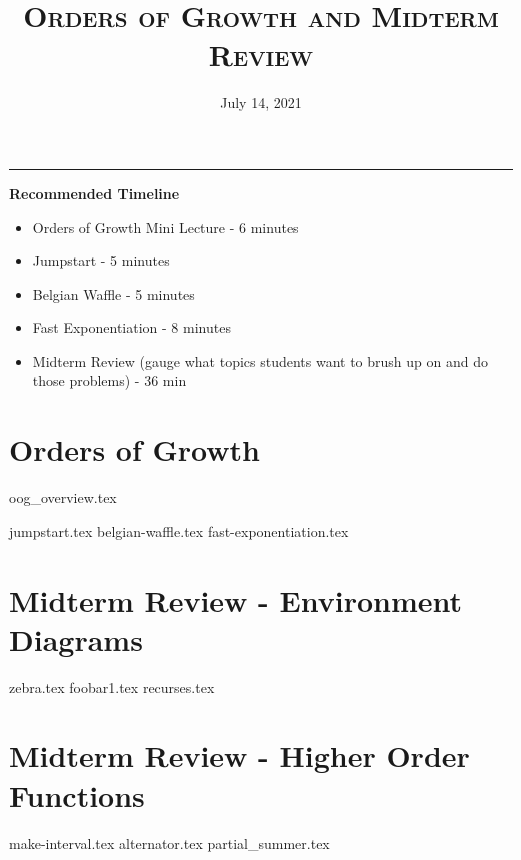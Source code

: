 \documentclass{exam}
\title{\textsc{Orders of Growth and Midterm Review}}
\date{July 14, 2021}
\begin{document}
\maketitle
\rule{\textwidth}{0.15em}
\fontsize{12}{15}\selectfont


\begin{guide}
    \textbf{Recommended Timeline}
    \begin{itemize}
        \item Orders of Growth Mini Lecture - 6 minutes
        \item Jumpstart - 5 minutes
        \item Belgian Waffle - 5 minutes
        \item Fast Exponentiation - 8 minutes
        \item Midterm Review (gauge what topics students want to brush up on and do those problems) - 36 min
    \end{itemize}
\end{guide}

\section{Orders of Growth}
{oog_overview.tex}
\begin{questions}
{jumpstart.tex}
{belgian-waffle.tex}
{fast-exponentiation.tex}
\end{questions}


\newpage
\section{Midterm Review - Environment Diagrams}
\begin{questions}
{zebra.tex}
{foobar1.tex}
{recurses.tex}
\end{questions}

\newpage
\section{Midterm Review - Higher Order Functions}
\begin{questions}
{make-interval.tex}
{alternator.tex}
{partial_summer.tex}
\end{questions}
\end{document}

